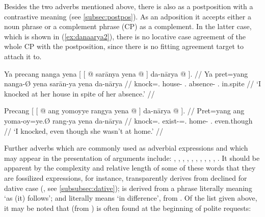 Besides the two adverbs mentioned above, there is also
 as a postposition
with a contrastive meaning (see \autoref{subsec:postpos}). As an adposition it
accepts either a noun phrase or a complement phrase (CP) as a complement. In
the latter case, which is shown in (\ref{ex:danaarya2}), there is no locative
case agreement of the whole CP with the postposition, since there is no fitting
agreement target to attach it to.

\pex\label{ex:danaarya}
\a\label{ex:danaarya1}\begingl
	\gla Ya precang nanga yena {\normalfont[ [} @ sarānya 
		yena @ {\normalfont]} da-nārya @ {\normalfont]}. //
	\glb Ya pret=yang nanga-Ø yena {} sarān-ya yena {} da-nārya {} //
	\glc \LocT{} knock=\Fsg{}.\Aarg{} house-\Top{} \TsgF{}.\Gen{} {}
		absence-\Loc{} \TsgF{}.\Gen{} {} in.spite {} //
	\glft `I knocked at her house in spite of her absence.' //
\endgl

\a\label{ex:danaarya2}\begingl
	\gla Precang {\normalfont[ [} @ ang yomoyye rangya 
		yena @ {\normalfont]} da-nārya @ {\normalfont]}. //
	\glb Pret=yang {} ang yoma-oy=ye.Ø rang-ya yena {} da-nārya {} //
	\glc knock=\Fsg{}.\Aarg{} {} \AgtT{} exist-\Neg{}=\TsgF{}.\Top{} 
		home-\Loc{} \TsgF{}.\Gen{} {} even.though {} //
	\glft `I knocked, even though she wasn't at home.' //
\endgl

\xe

Further adverbs which are commonly used as adverbial expressions and which may 
appear in the presentation of arguments include:
,
,
,
,
,
,
,
,
,
,
.
It should be apparent by the complexity and relative length of some of these 
words that they are fossilized expressions, for instance, 
 transparently derives from 
 declined for dative case 
(, see \autoref{subsubsec:dative}); 
 is derived from a phrase literally meaning `as 
(it) follows'; and  literally 
means `in difference', from . Of the list given above, it may be noted that 
 (from ) is often found 
at the beginning of polite requests:

